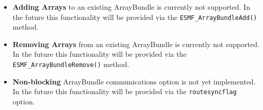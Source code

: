 
\begin{itemize}

\item {\bf Adding Arrays} to an existing ArrayBundle is currently not supported. In the future this functionality will be provided via the
{\tt ESMF\_ArrayBundleAdd()} method.

\item {\bf Removing Arrays} from an existing ArrayBundle is currently not supported. In the future this functionality will be provided via the
{\tt ESMF\_ArrayBundleRemove()} method.

\item {\bf Non-blocking} ArrayBundle communications option is not yet implemented. In the future this functionality will be provided via the
{\tt routesyncflag} option.

\end{itemize}
